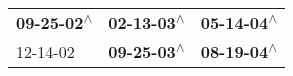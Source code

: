 \begin{supertabular}{lll}
 \textbf{09-25-02\textsuperscript{$\wedge$}} &  \textbf{02-13-03\textsuperscript{$\wedge$}} &  \textbf{05-14-04\textsuperscript{$\wedge$}} \\
                  12-14-02\textsuperscript{} &  \textbf{09-25-03\textsuperscript{$\wedge$}} &  \textbf{08-19-04\textsuperscript{$\wedge$}} \\
\end{supertabular}
